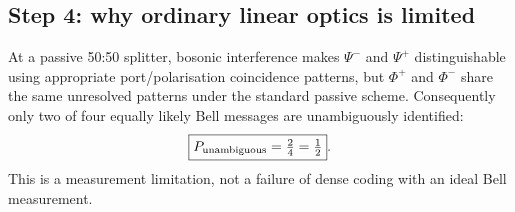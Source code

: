 \subsection*{Step 4: why ordinary linear optics is limited}
At a passive 50:50 splitter, bosonic interference makes
\(\Psi^-\) and \(\Psi^+\) distinguishable using appropriate
port/polarisation coincidence patterns, but
\(\Phi^+\) and \(\Phi^-\) share the same unresolved
patterns under the standard passive scheme.
Consequently only two of four equally likely Bell
messages are unambiguously identified:
\[
\boxed{P_{\rm unambiguous}=\tfrac24=\tfrac12}.
\]
This is a measurement limitation, not a failure of dense
coding with an ideal Bell measurement.
